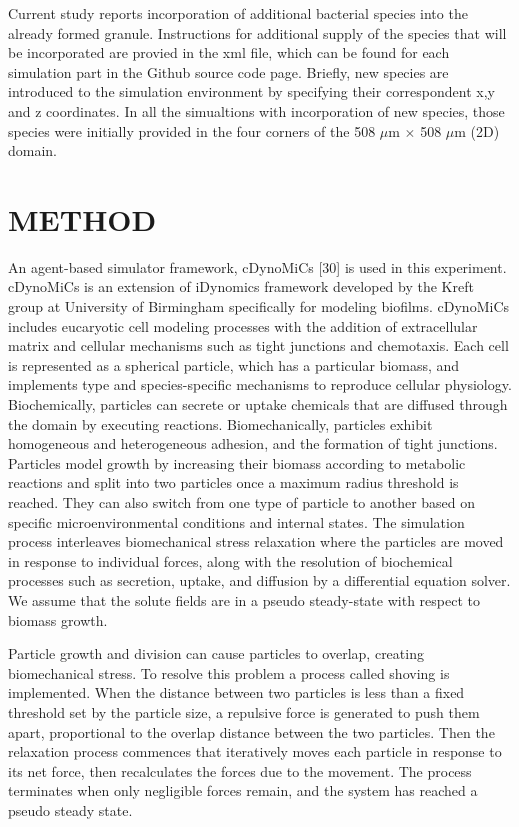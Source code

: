 Current study reports incorporation of additional bacterial species into the already formed granule. Instructions for additional supply of the species that will be incorporated are provied in the xml file, which can be found for each simulation part in the Github source code page. Briefly, new species are introduced to the simulation environment by specifying their correspondent x,y and z coordinates. In all the simualtions with incorporation of new species, those species were initially provided in the four corners of the 508 $\mu$m $\times$ 508  $\mu$m  (2D) domain. 



\chapter{METHOD}

An agent-based simulator framework, cDynoMiCs [30] is used in this experiment. cDynoMiCs is an extension of iDynomics framework developed by the Kreft group at University of Birmingham specifically for modeling biofilms. cDynoMiCs includes eucaryotic cell modeling processes with the addition of extracellular matrix and cellular mechanisms such as tight junctions and chemotaxis. Each cell is represented as a spherical particle, which has a particular biomass, and implements type and species-specific mechanisms to reproduce cellular physiology. Biochemically, particles can secrete or uptake chemicals that are diffused through the domain by executing reactions. Biomechanically, particles exhibit homogeneous and heterogeneous adhesion, and the formation of tight junctions. Particles model growth by increasing their biomass according to metabolic reactions and split into two particles once a maximum radius threshold is reached. They can also switch from one type of particle to another based on specific microenvironmental conditions and internal states. The simulation process interleaves biomechanical stress relaxation where the particles are moved in response to individual forces, along with the resolution of biochemical processes such as secretion, uptake, and diffusion by a differential equation solver. We assume that the solute fields are in a pseudo steady-state with respect to biomass growth.

Particle growth and division can cause particles to overlap, creating biomechanical stress. To resolve this problem a process called shoving is implemented. When the distance between two particles is less than a fixed threshold set by the particle size, a repulsive force is generated to push them apart, proportional to the overlap distance between the two particles. Then the relaxation process commences that iteratively moves each particle in response to its net force, then recalculates the forces due to the movement. The process terminates when only negligible forces remain, and the system has reached a pseudo steady state.

